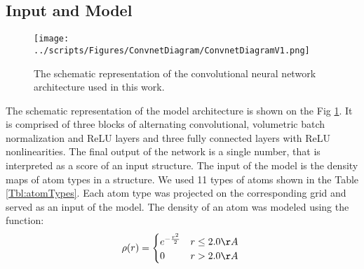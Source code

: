 \documentclass[a4paper,10pt]{article}
\begin{document}
\subsection{Input and Model}
\begin{figure}[H]
    \centering
    \texttt{[image: ../scripts/Figures/ConvnetDiagram/ConvnetDiagramV1.png]}
    \caption{The schematic representation of the convolutional neural network architecture used in this work.}
    \label{Fig:CNNModel}
\end{figure}
The schematic representation of the model architecture is shown on the Fig \ref{Fig:CNNModel}. It is comprised of three blocks of alternating convolutional, 
volumetric batch normalization and ReLU layers and three 
fully connected layers with ReLU nonlinearities. The final output of the network is a single number, that is interpreted as a score of an input structure.
The input of the model is the density maps of atom types in a structure. We used 11 types of atoms shown in the Table \ref{Tbl:atomTypes}. 
Each atom type was projected on the corresponding grid and served as an input of the model. The density of an atom was modeled using the function: 
$$
\rho(r) =  \begin{cases}
               e^{-\frac{r^2}{2}}&r\leq 2.0\AA~\\
               0                 &r>2.0\AA~\\
            \end{cases}
$$
\end{document}
